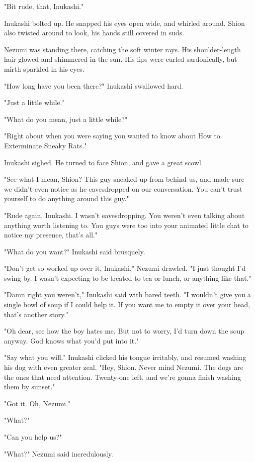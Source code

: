 "Bit rude, that, Inukashi."

Inukashi bolted up. He snapped his eyes open wide, and whirled around.
Shion also twisted around to look, his hands still covered in suds.

Nezumi was standing there, catching the soft winter rays. His
shoulder-length hair glowed and shimmered in the sun. His lips were
curled sardonically, but mirth sparkled in his eyes.

"How long have you been there?" Inukashi swallowed hard.

"Just a little while."

"What do you mean, just a little while?"

"Right about when you were saying you wanted to know about How to
Exterminate Sneaky Rats."

Inukashi sighed. He turned to face Shion, and gave a great scowl.

"See what I mean, Shion? This guy sneaked up from behind us, and made
sure we didn't even notice as he eavesdropped on our conversation. You
can't trust yourself to do anything around this guy."

"Rude again, Inukashi. I wasn't eavesdropping. You weren't even talking
about anything worth listening to. You guys were too into your animated
little chat to notice my presence, that's all."

"What do you want?" Inukashi said brusquely.

"Don't get so worked up over it, Inukashi," Nezumi drawled. "I just
thought I'd swing by. I wasn't expecting to be treated to tea or lunch,
or anything like that."

"Damn right you weren't," Inukashi said with bared teeth. "I wouldn't
give you a single bowl of soup if I could help it. If you want me to
empty it over your head, that's another story."

"Oh dear, see how the boy hates me. But not to worry, I'd turn down the
soup anyway. God knows what you'd put into it."

"Say what you will." Inukashi clicked his tongue irritably, and resumed
washing his dog with even greater zeal. "Hey, Shion. Never mind Nezumi.
The dogs are the ones that need attention. Twenty-one left, and we're
gonna finish washing them by sunset."

"Got it. Oh, Nezumi."

"What?"

"Can you help us?"

"What?" Nezumi said incredulously.

